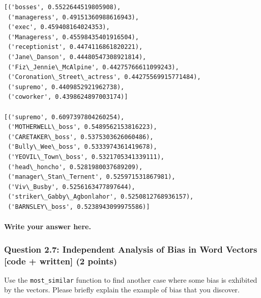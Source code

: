 \documentclass[18pt]{article}
\begin{document}
    \begin{Verbatim}[commandchars=\\\{\}]
[('bosses', 0.5522644519805908),
 ('manageress', 0.49151360988616943),
 ('exec', 0.459408164024353),
 ('Manageress', 0.45598435401916504),
 ('receptionist', 0.4474116861820221),
 ('Jane\_Danson', 0.44480547308921814),
 ('Fiz\_Jennie\_McAlpine', 0.44275766611099243),
 ('Coronation\_Street\_actress', 0.44275569915771484),
 ('supremo', 0.4409852921962738),
 ('coworker', 0.4398624897003174)]

[('supremo', 0.6097397804260254),
 ('MOTHERWELL\_boss', 0.5489562153816223),
 ('CARETAKER\_boss', 0.5375303626060486),
 ('Bully\_Wee\_boss', 0.5333974361419678),
 ('YEOVIL\_Town\_boss', 0.5321705341339111),
 ('head\_honcho', 0.5281980037689209),
 ('manager\_Stan\_Ternent', 0.525971531867981),
 ('Viv\_Busby', 0.5256163477897644),
 ('striker\_Gabby\_Agbonlahor', 0.5250812768936157),
 ('BARNSLEY\_boss', 0.5238943099975586)]

    \end{Verbatim}

    \hypertarget{write-your-answer-here.}{%
\paragraph{Write your answer here.}\label{write-your-answer-here.}}

    \hypertarget{question-2.7-independent-analysis-of-bias-in-word-vectors-code-written-2-points}{%
\subsubsection{Question 2.7: Independent Analysis of Bias in Word
Vectors {[}code + written{]} (2
points)}\label{question-2.7-independent-analysis-of-bias-in-word-vectors-code-written-2-points}}

Use the \texttt{most\_similar} function to find another case where some
bias is exhibited by the vectors. Please briefly explain the example of
bias that you discover.
\end{document}
